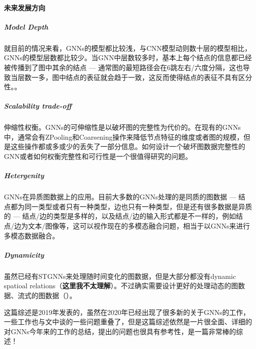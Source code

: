 \paragraph{未来发展方向}
\subparagraph{Model Depth}
就目前的情况来看，GNNs的模型都比较浅，与CNN模型动则数十层的模型相比，GNNs的模型层数都比较少。当GNN中层数较多时，基本上每个结点的信息都已经被传播到了图中其余的结点 --- 通常图的最短路径会在6跳左右/六度分隔，这也导致当层数一多，图中结点的表征就会趋于一致，这反而使得结点的表征不具有区分性。。

\subparagraph{Scalability trade-off}
伸缩性权衡。GNNs的可伸缩性是以破坏图的完整性为代价的。在现有的GNNs中，通常会有ZPooling和Coarsening操作来降低节点特征的维度或者图的规模，但是这些操作都或多或少的丢失了一部分信息。如何设计一个破坏图数据完整性的GNN或者如何权衡完整性和可行性是一个很值得研究的问题。

\subparagraph{Hetergenity}
GNNs在异质图数据上的应用。目前大多数的GNNs处理的是同质的图数据 --- 结点都为同一类型或者只有一种类型，边也只有一种类型，但是还有很多数据是异质的 --- 结点/边的类型是多样的，以及结点/边的输入形式都是不一样的，例如结点/边为文本/图像等，这可以视作现在的多模态融合问题，相当于以GNNs来进行多模态数据融合。

\subparagraph{Dynamicity}
虽然已经有STGNNs来处理随时间变化的图数据，但是大部分都没有dynamic spatioal relations（\textbf{这里我不太理解}）。不过确实需要设计更好的处理动态的图数据、流式的图数据（）。

这篇综述是2019年发表的，虽然在2020年已经出现了很多新的关于GNNs的工作，一些工作也与文中谈的一些问题重叠了，但是这篇综述依然是一片很全面、详细的对GNNs今年来的工作的总结，提出的问题也很具有参考性，是一篇非常棒的综述！





